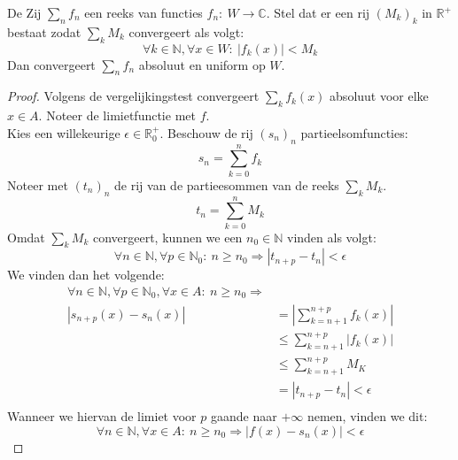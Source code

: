 \documentclass[main.tex]{subfiles}
\begin{document}
\begin{bst}
  De 
  Zij $\sum_{n}f_{n}$ een reeks van functies $f_{n}:\ W \rightarrow \mathbb{C}$.
  Stel dat er een rij $(M_{k})_{k}$ in $\mathbb{R}^{+}$ bestaat zodat $\sum_{k}M_{k}$ convergeert als volgt:
  \[ \forall k\in \mathbb{N}, \forall x \in W:\ |f_{k}(x)| < M_{k} \]
  Dan convergeert $\sum_{n}f_{n}$ absoluut en uniform op $W$.

  \begin{proof}
    Volgens de vergelijkingstest convergeert $\sum_{k}f_{k}(x)$ absoluut voor elke $x\in A$.
    Noteer de limietfunctie met $f$.\\
    Kies een willekeurige $\epsilon \in \mathbb{R}_{0}^{+}$.
    Beschouw de rij $(s_{n})_{n}$ partieelsomfuncties:
    \[ s_{n} = \sum_{k=0}^{n}f_{k} \]
    Noteer met $(t_{n})_{n}$ de rij van de partieesommen van de reeks $\sum_{k}M_{k}$.
    \[ t_{n} = \sum_{k=0}^{n}M_{k} \]
    Omdat $\sum_{k}M_{k}$ convergeert, kunnen we een $n_{0}\in \mathbb{N}$ vinden als volgt:
    \[ \forall n \in \mathbb{N}, \forall p\in \mathbb{N}_{0}:\ n \ge n_{0} \Rightarrow |t_{n+p}-t_{n}| < \epsilon \]
    We vinden dan het volgende:
    \[
    \begin{array}{rl}
      \forall n\in \mathbb{N}, \forall p\in \mathbb{N}_{0}, \forall x\in A:\ n \ge n_{0} \Rightarrow\\
      |s_{n+p}(x) - s_{n}(x)|
      &= \left|\sum_{k=n+1}^{n+p}f_{k}(x)\right|\\
      &\le \sum_{k=n+1}^{n+p}|f_{k}(x)|\\
      &\le \sum_{k=n+1}^{n+p}M_{K}\\
      &=|t_{n+p}-t_{n}| < \epsilon\\
    \end{array}
    \]
    Wanneer we hiervan de limiet voor $p$ gaande naar $+\infty$ nemen, vinden we dit:
    \[ \forall n \in \mathbb{N}, \forall x\in A:\ n \ge n_{0} \Rightarrow |f(x)-s_{n}(x)| < \epsilon \]
  \end{proof}
\end{bst}
\end{document}
